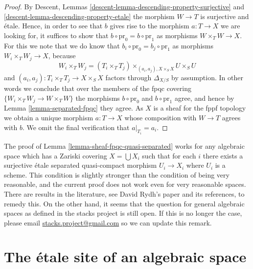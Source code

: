 \begin{proof}
\medskip\noindent
By
Descent, Lemmas \ref{descent-lemma-descending-property-surjective}
and \ref{descent-lemma-descending-property-etale}
the morphism $W \to T$ is surjective and \'etale. Hence, in order to see
that $b$ gives rise to the morphism $a : T \to X$ we are looking for,
it suffices to show that $b \circ \text{pr}_0 = b \circ \text{pr}_1$
as morphisms $W \times_T W \to X$. For this we note that we do know
that $b_i \circ \text{pr}_0 = b_j \circ \text{pr}_1$ as morphisms
$W_i \times_T W_j \to X$, because
$$
W_i \times_T W_j = (T_i \times_T T_j)
\times_{(a_i, a_j), X \times_S X} U \times_S U
$$
and $(a_i, a_j) : T_i \times_T T_j \to X \times_S X$ factors
through $\Delta_{X/S}$ by assumption. In other words we conclude that
over the members of the fpqc covering $\{W_i \times_T W_j \to W \times_T W\}$
the morphisms $b \circ \text{pr}_0$ and $b \circ \text{pr}_1$ agree,
and hence by
Lemma \ref{lemma-separated-fpqc}
they agree. As $X$ is a sheaf for the fppf topology we obtain a unique
morphism $a : T \to X$ whose composition with $W \to T$ agrees with $b$.
We omit the final verification that $a|_{T_i} = a_i$.
\end{proof}

\begin{remark}
\label{remark-proof-works-when}
The proof of
Lemma \ref{lemma-sheaf-fpqc-quasi-separated}
works for any algebraic space which has a
Zariski covering $X = \bigcup X_i$ such that for each $i$ there exists
a surjective \'etale separated quasi-compact morphism $U_i \to X_i$
where $U_i$ is a scheme. This condition is slightly stronger than the
condition of being very reasonable, and the current proof does not work
even for very reasonable spaces. There are results in the literature, see
David Rydh's paper \cite{rydh_descent} and its references, to remedy this.
On the other hand, it seems that the question for general algebraic spaces
as defined in the stacks project is still open. If this is no longer the
case, please email
\href{mailto:stacks.project@gmail.com}{stacks.project@gmail.com}
so we can update this remark.
\end{remark}








\section{The \'etale site of an algebraic space}
\label{section-etale-site}

